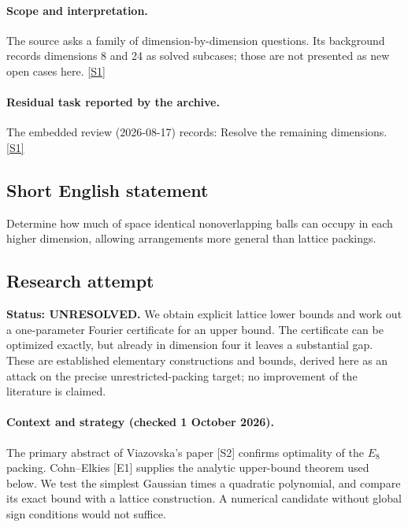 \documentclass[11pt,a4paper]{article}
\newcommand{\sref}[2]{\hyperlink{source:#1:#2}{[S#2]}}
\begin{document}
\paragraph{Scope and interpretation.}

The source asks a family of dimension-by-dimension questions. Its background records dimensions 8 and 24 as solved subcases; those are not presented as new open cases here. \sref{19}{1}

\paragraph{Residual task reported by the archive.}

The embedded review (2026-08-17) records: Resolve the remaining dimensions. \sref{19}{1}

\subsection{Short English statement}

Determine how much of space identical nonoverlapping balls can occupy in each higher dimension, allowing arrangements more general than lattice packings.

\subsection{Research attempt}
\textbf{Status: UNRESOLVED.} We obtain explicit lattice lower bounds and work out a one-parameter Fourier certificate for an upper bound. The certificate can be optimized exactly, but already in dimension four it leaves a substantial gap. These are established elementary constructions and bounds, derived here as an attack on the precise unrestricted-packing target; no improvement of the literature is claimed.

\paragraph{Context and strategy (checked 1 October 2026).}
The primary abstract of Viazovska's paper [S2] confirms optimality of the $E_8$ packing. Cohn--Elkies [E1] supplies the analytic upper-bound theorem used below. We test the simplest Gaussian times a quadratic polynomial, and compare its exact bound with a lattice construction. A numerical candidate without global sign conditions would not suffice.
\end{document}
